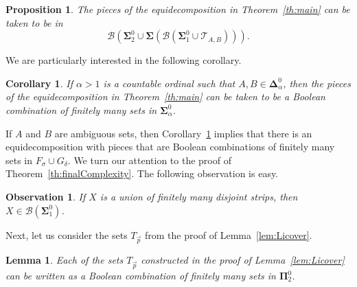 \documentclass[12pt,a4paper]{amsart}
\numberwithin{equation}{section}
\newcommand{\bSigma}{\boldsymbol{\Sigma}}
\newcommand{\bPi}{\boldsymbol{\Pi}}
\newcommand{\bDelta}{\boldsymbol{\Delta}}
\newcommand{\bB}{\boldsymbol{\mathcal{B}}}
\newtheorem{lemma}[equation]{Lemma}
\newtheorem{proposition}[equation]{Proposition}
\newtheorem{corollary}[equation]{Corollary}
\newtheorem{obs}[equation]{Observation}
\theoremstyle{definition}
\begin{document}
\begin{proposition}
\label{prop:finalComplexity}
The pieces of the equidecomposition in  Theorem~\ref{th:main} can be taken to be in
\[\bB\left(\bSigma_2^0 \cup\bSigma\left(\bB\left(\bSigma_1^0\cup \mathcal{T}_{A,B}\right)\right)\right).\]
\end{proposition}

We are particularly interested in the following corollary.

\begin{corollary}
\label{cor:standardComplexity}
If $\alpha>1$ is a countable ordinal such that $A,B\in\bDelta_\alpha^0$, then the pieces of the equidecomposition in Theorem~\ref{th:main} can be taken to be a Boolean combination of finitely many sets in $\bSigma_\alpha^0$. 
\end{corollary}

If $A$ and $B$ are ambiguous sets, then Corollary~\ref{cor:standardComplexity} implies that there is an equidecomposition with pieces that are Boolean combinations of finitely many sets in $F_\sigma\cup G_\delta$. We turn our attention to the proof of Theorem~\ref{th:finalComplexity}.  The following observation is easy. 

\begin{obs}
\label{obs:XiHierarchy}
If $X$ is a union of finitely many disjoint strips, then $X\in \mathcal{B}\left(\bSigma_1^0\right)$.
\end{obs}

Next, let us consider the sets $T_{\vec{p}}$ from the proof of Lemma~\ref{lem:Licover}. 

\begin{lemma}
\label{lem:TpHierarchy}
Each of the sets $T_{\vec{p}}$ constructed in the proof of Lemma~\ref{lem:Licover} can be written as a Boolean combination of finitely many sets in $\bPi_2^0$.
\end{lemma}
\end{document}
